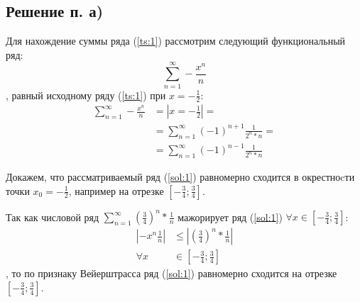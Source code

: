 \documentclass[12pt, a4paper]{article}
\begin{document}
\subsection{Решение п. а)}
Для нахождение суммы ряда (\ref{ts:1}) рассмотрим следующий функциональный ряд:
\begin{equation} \label{sol:1}
 \sum_{n=1}^{\infty}-\frac{x^n}{n}
\end{equation},
равный исходному ряду (\ref{ts:1}) при $x=-\frac{1}{2}$:
\begin{equation*}
\begin{aligned}
 \sum_{n=1}^{\infty}-\frac{x^n}{n} &= \left|x=-\frac{1}{2}\right| = \\
  &= \sum_{n=1}^{\infty}(-1)^{n+1}\frac{1}{2^n*n} =\\
  &= \sum_{n=1}^{\infty}(-1)^{n-1}\frac{1}{2^n*n}
 \end{aligned}
\end{equation*}

Докажем, что рассматриваемый ряд (\ref{sol:1}) равномерно сходится в окрестноcти точки $x_0 = -\frac{1}{2}$, например на отрезке $\left[-\frac{3}{4};\frac{3}{4}\right]$.

Так как числовой ряд $\sum_{n=1}^{\infty}\left(\frac{3}{4}\right)^n*\frac{1}{n}$ мажорирует ряд (\ref{sol:1}) $\forall x \in \left[-\frac{3}{4};\frac{3}{4}\right]$:
\begin{equation*}
\begin{aligned}
\left|-x^n\frac{1}{n}\right| &\leq \left|\left(\frac{3}{4}\right)^n*\frac{1}{n}\right| \\
\forall x &\in \left[-\frac{3}{4};\frac{3}{4}\right]
\end{aligned}
\end{equation*},
то по признаку Вейерштрасса ряд (\ref{sol:1}) равномерно сходится на отрезке $\left[-\frac{3}{4};\frac{3}{4}\right]$.
\end{document}
